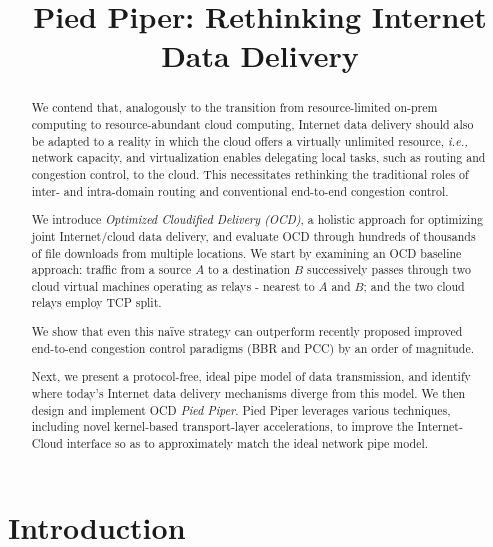\documentclass[newfonts=false,format=sigconf,10pt,letterpaper]{acmart}
\title{Pied Piper: Rethinking Internet Data Delivery}
\author{}
\date{}
\providecommand{\ie}{\emph{i.e.,} }
\newcommand{\name}{Pied Piper\xspace}
\begin{document}
 \sloppypar


\begin{abstract}

We contend that, analogously to the transition from resource-limited on-prem computing to resource-abundant cloud computing, Internet data delivery should also be adapted to a reality in which the cloud offers a virtually unlimited resource, \ie network capacity, and virtualization enables delegating local tasks, such as routing and congestion control, to the cloud. This necessitates rethinking the traditional roles of  inter- and intra-domain routing and conventional end-to-end congestion control.

We introduce \textit{Optimized Cloudified Delivery (OCD)}, a holistic approach for optimizing joint Internet/cloud data delivery, and evaluate OCD through hundreds of thousands of file downloads from multiple locations. We start by examining an OCD baseline approach:  traffic from a source $A$ to a destination $B$ successively passes through two cloud virtual machines operating as relays - nearest to $A$ and $B$; and the two cloud relays employ TCP split.

We show that even this na\"ive strategy can outperform recently proposed improved end-to-end congestion control paradigms (BBR and PCC) by an order of magnitude.

Next, we present a protocol-free, ideal pipe model of data transmission, 
and identify where today's Internet data delivery mechanisms diverge from this model. We then design and implement OCD \textit{\name}. \name leverages various techniques, including novel kernel-based transport-layer accelerations, to improve the Internet-Cloud interface so as to approximately match the ideal network pipe model.
\end{abstract}




\maketitle





\section{Introduction}

{\let\thefootnote\relax{}}
\end{document}
